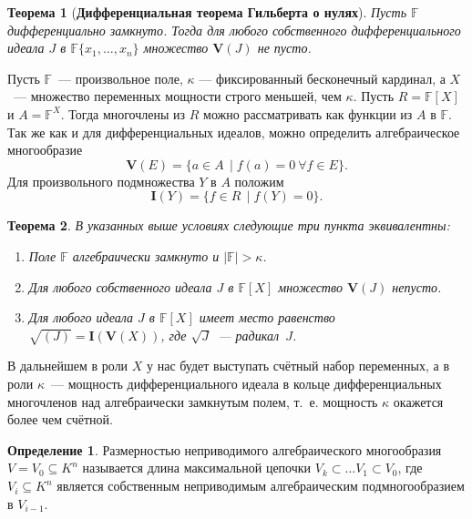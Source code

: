 \documentclass[16pt]{article}
\theoremstyle{plain1}
\theoremstyle{plain2}
\theoremstyle{plain}
\newtheorem{theorem}{Теорема}
\theoremstyle{plain3}
\theoremstyle{definition}
\newtheorem{definition}[theorem2]{Определение}
\theoremstyle{remark}
\begin{document}
\begin{theorem}[\bf Дифференциальная теорема Гильберта о нулях]\label{theorem:th 0 for dif}
Пусть $\mathbb{F}$ дифференциально замкнуто. Тогда для любого собственного дифференциального идеала $J$ в
$\mathbb{F}\{x_1,\ldots,x_n\}$ множество $\mathbf{V}(J)$ не пусто. \cite[Chapter~IV,
Section~2, Theorem~1]{Kolchin 2}
\end{theorem}

Пусть $\mathbb{F}$~--- произвольное поле, $\kappa$ --- фиксированный
бесконечный кардинал, а $X$~--- множество переменных мощности строго
меньшей, чем $\kappa$. Пусть $R=\mathbb{F}[X]$ и $A=\mathbb{F}^X$. Тогда многочлены из
$R$ можно рассматривать как функции из $A$ в $\mathbb{F}$. Так же как и для
дифференциальных идеалов, можно определить алгебраическое многообразие $$\mathbf{V}(E)=\{a\in A\,
\mid f(a)=0~\forall f\in E\}.$$ Для произвольного подмножества $Y$
в $A$ положим
$$
 \mathbf{I}(Y)=\{f \in R\, \mid f(Y)=0\}.
$$

\begin{theorem}\label{theorem:th 0 for alg}
В указанных выше условиях следующие три пункта эквивалентны:

\begin{enumerate}
\item Поле $\mathbb{F}$ алгебраически замкнуто и $|\mathbb{F}|>\kappa$.

\item Для любого собственного идеала $J$ в $\mathbb{F}[X]$ множество
$\mathbf{V}(J)$ непусто.

\item Для любого идеала $J$ в $\mathbb{F}[X]$ имеет место равенство
$\sqrt{(J)}=\mathbf{I}(\mathbf{V}(X))$, где $\sqrt{J}$~--- радикал~$J$.
\end{enumerate}
\cite[Section~1, Theorem]{Lang}
\end{theorem}

В дальнейшем в роли $X$ у нас будет выступать счётный набор
переменных, а в роли $\kappa$~--- мощность дифференциального идеала
в кольце дифференциальных многочленов
над алгебраически замкнутым полем, т.~е. мощность $\kappa$
окажется более чем счётной.


\begin{definition} Размерностью неприводимого алгебраического многообразия
${V}={V}_0\subseteq K^n$ называется длина максимальной цепочки
${V}_k\subset\ldots{V}_1\subset{V}_0$, где
${V}_i\subseteq K^n$ является собственным неприводимым алгебраическим подмногообразием
в ${V}_{i-1}$.
\end{definition}
\end{document}
